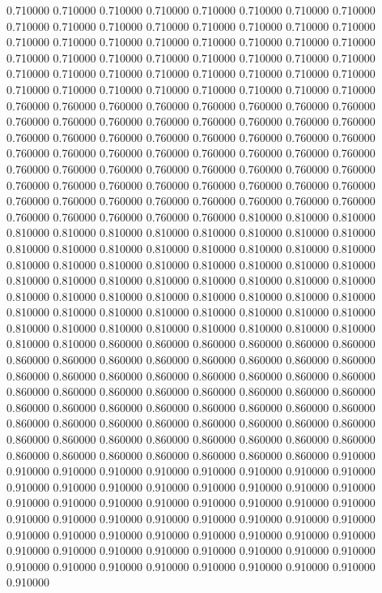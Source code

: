 0.710000
0.710000
0.710000
0.710000
0.710000
0.710000
0.710000
0.710000
0.710000
0.710000
0.710000
0.710000
0.710000
0.710000
0.710000
0.710000
0.710000
0.710000
0.710000
0.710000
0.710000
0.710000
0.710000
0.710000
0.710000
0.710000
0.710000
0.710000
0.710000
0.710000
0.710000
0.710000
0.710000
0.710000
0.710000
0.710000
0.710000
0.710000
0.710000
0.710000
0.710000
0.710000
0.710000
0.710000
0.710000
0.710000
0.710000
0.710000
0.760000
0.760000
0.760000
0.760000
0.760000
0.760000
0.760000
0.760000
0.760000
0.760000
0.760000
0.760000
0.760000
0.760000
0.760000
0.760000
0.760000
0.760000
0.760000
0.760000
0.760000
0.760000
0.760000
0.760000
0.760000
0.760000
0.760000
0.760000
0.760000
0.760000
0.760000
0.760000
0.760000
0.760000
0.760000
0.760000
0.760000
0.760000
0.760000
0.760000
0.760000
0.760000
0.760000
0.760000
0.760000
0.760000
0.760000
0.760000
0.760000
0.760000
0.760000
0.760000
0.760000
0.760000
0.760000
0.760000
0.760000
0.760000
0.760000
0.760000
0.760000
0.810000
0.810000
0.810000
0.810000
0.810000
0.810000
0.810000
0.810000
0.810000
0.810000
0.810000
0.810000
0.810000
0.810000
0.810000
0.810000
0.810000
0.810000
0.810000
0.810000
0.810000
0.810000
0.810000
0.810000
0.810000
0.810000
0.810000
0.810000
0.810000
0.810000
0.810000
0.810000
0.810000
0.810000
0.810000
0.810000
0.810000
0.810000
0.810000
0.810000
0.810000
0.810000
0.810000
0.810000
0.810000
0.810000
0.810000
0.810000
0.810000
0.810000
0.810000
0.810000
0.810000
0.810000
0.810000
0.810000
0.810000
0.810000
0.810000
0.810000
0.810000
0.860000
0.860000
0.860000
0.860000
0.860000
0.860000
0.860000
0.860000
0.860000
0.860000
0.860000
0.860000
0.860000
0.860000
0.860000
0.860000
0.860000
0.860000
0.860000
0.860000
0.860000
0.860000
0.860000
0.860000
0.860000
0.860000
0.860000
0.860000
0.860000
0.860000
0.860000
0.860000
0.860000
0.860000
0.860000
0.860000
0.860000
0.860000
0.860000
0.860000
0.860000
0.860000
0.860000
0.860000
0.860000
0.860000
0.860000
0.860000
0.860000
0.860000
0.860000
0.860000
0.860000
0.860000
0.860000
0.860000
0.860000
0.860000
0.860000
0.860000
0.860000
0.910000
0.910000
0.910000
0.910000
0.910000
0.910000
0.910000
0.910000
0.910000
0.910000
0.910000
0.910000
0.910000
0.910000
0.910000
0.910000
0.910000
0.910000
0.910000
0.910000
0.910000
0.910000
0.910000
0.910000
0.910000
0.910000
0.910000
0.910000
0.910000
0.910000
0.910000
0.910000
0.910000
0.910000
0.910000
0.910000
0.910000
0.910000
0.910000
0.910000
0.910000
0.910000
0.910000
0.910000
0.910000
0.910000
0.910000
0.910000
0.910000
0.910000
0.910000
0.910000
0.910000
0.910000
0.910000
0.910000
0.910000
0.910000
